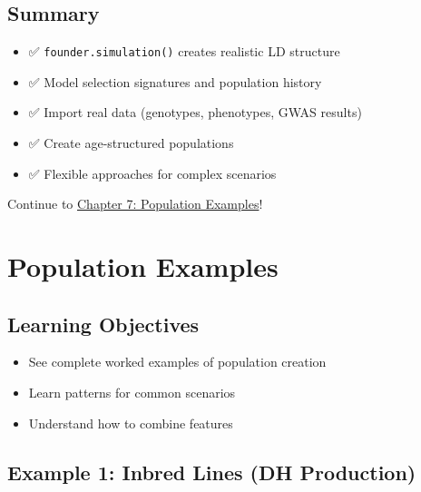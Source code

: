\documentclass[
  letterpaper,
]{book}
\providecommand{\tightlist}{%
  \setlength{\itemsep}{0pt}\setlength{\parskip}{0pt}}
\begin{document}
\section{Summary}\label{summary-5}

\begin{itemize}
\tightlist
\item
  ✅ \texttt{founder.simulation()} creates realistic LD structure
\item
  ✅ Model selection signatures and population history
\item
  ✅ Import real data (genotypes, phenotypes, GWAS results)
\item
  ✅ Create age-structured populations
\item
  ✅ Flexible approaches for complex scenarios
\end{itemize}

Continue to \href{07-population-examples.qmd}{Chapter 7: Population
Examples}!

\chapter{Population Examples}\label{sec-population-examples}

\section{Learning Objectives}\label{learning-objectives-6}

\begin{itemize}
\tightlist
\item
  See complete worked examples of population creation
\item
  Learn patterns for common scenarios
\item
  Understand how to combine features
\end{itemize}

\section{Example 1: Inbred Lines (DH
Production)}\label{sec-example-inbred}
\end{document}
